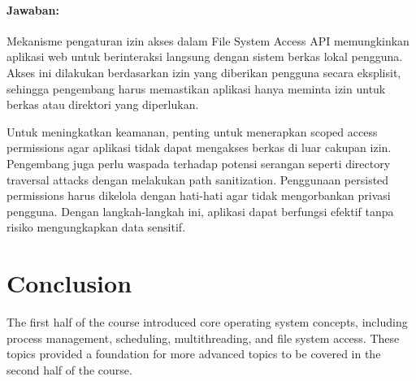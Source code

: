 \documentclass[12pt]{article}
\begin{document}
\paragraph{Jawaban:} Mekanisme pengaturan izin akses dalam File System Access API memungkinkan aplikasi web untuk berinteraksi langsung dengan sistem berkas lokal pengguna. Akses ini dilakukan berdasarkan izin yang diberikan pengguna secara eksplisit, sehingga pengembang harus memastikan aplikasi hanya meminta izin untuk berkas atau direktori yang diperlukan.

Untuk meningkatkan keamanan, penting untuk menerapkan scoped access permissions agar aplikasi tidak dapat mengakses berkas di luar cakupan izin. Pengembang juga perlu waspada terhadap potensi serangan seperti directory traversal attacks dengan melakukan path sanitization. Penggunaan persisted permissions harus dikelola dengan hati-hati agar tidak mengorbankan privasi pengguna. Dengan langkah-langkah ini, aplikasi dapat berfungsi efektif tanpa risiko mengungkapkan data sensitif.



\section{Conclusion}
The first half of the course introduced core operating system concepts, including process management, scheduling, multithreading, and file system access. These topics provided a foundation for more advanced topics to be covered in the second half of the course.
\end{document}
